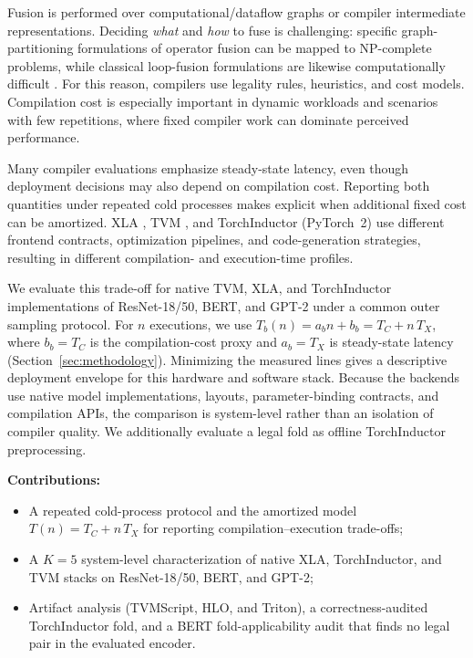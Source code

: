 \documentclass[sigconf]{acmart}
\DeclareRobustCommand{\tcode}[1]{\texttt{\seqsplit{#1}}}
\begin{document}
Fusion is performed over computational/dataflow graphs or compiler intermediate representations. Deciding \emph{what} and \emph{how} to fuse is challenging: specific graph-partitioning formulations of operator fusion can be mapped to NP-complete problems, while classical loop-fusion formulations are likewise computationally difficult \cite{canesche2025xnnc,darte1999}. For this reason, compilers use legality rules, heuristics, and cost models. Compilation cost is especially important in dynamic workloads and scenarios with few repetitions, where fixed compiler work can dominate perceived performance.

Many compiler evaluations emphasize steady-state latency, even though deployment decisions may also depend on compilation cost. Reporting both quantities under repeated cold processes makes explicit when additional fixed cost can be amortized. XLA \cite{snider2023xla}, TVM \cite{chen2018tvm}, and TorchInductor (PyTorch~2) \cite{pytorch2022} use different frontend contracts, optimization pipelines, and code-generation strategies, resulting in different compilation- and execution-time profiles.

We evaluate this trade-off for native TVM, XLA, and TorchInductor implementations of ResNet-18/50, BERT, and GPT-2 under a common outer sampling protocol. For \(n\) executions, we use \(T_b(n)=a_b n+b_b=T_C+n\,T_X\), where \(b_b=T_C\) is the compilation-cost proxy and \(a_b=T_X\) is steady-state latency (Section~\ref{sec:methodology}). Minimizing the measured lines gives a descriptive deployment envelope for this hardware and software stack. Because the backends use native model implementations, layouts, parameter-binding contracts, and compilation APIs, the comparison is system-level rather than an isolation of compiler quality. We additionally evaluate a legal \tcode{Conv--BatchNorm} fold as offline TorchInductor preprocessing.

\textbf{Contributions:}
\begin{itemize}
    \item A repeated cold-process protocol and the amortized model \(T(n)=T_C+n\,T_X\) for reporting compilation--execution trade-offs;
    \item A \(K=5\) system-level characterization of native XLA, TorchInductor, and TVM stacks on ResNet-18/50, BERT, and GPT-2;
    \item Artifact analysis (TVMScript, HLO, and Triton), a correctness-audited TorchInductor \tcode{Conv--BatchNorm} fold, and a BERT fold-applicability audit that finds no legal \mbox{\tcode{LayerNorm--Linear}} pair in the evaluated encoder.
\end{itemize}
\end{document}
